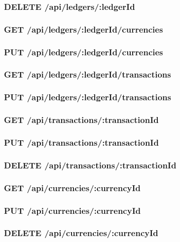 \documentclass[a4paper,parskip=half]{scrartcl}
\begin{document}
\subsubsection{DELETE /api/ledgers/:ledgerId}

\subsubsection{GET /api/ledgers/:ledgerId/currencies}

\subsubsection{PUT /api/ledgers/:ledgerId/currencies}

\subsubsection{GET /api/ledgers/:ledgerId/transactions}

\subsubsection{PUT /api/ledgers/:ledgerId/transactions}

\subsubsection{GET /api/transactions/:transactionId}

\subsubsection{PUT /api/transactions/:transactionId}

\subsubsection{DELETE /api/transactions/:transactionId}

\subsubsection{GET /api/currencies/:currencyId}

\subsubsection{PUT /api/currencies/:currencyId}

\subsubsection{DELETE /api/currencies/:currencyId}




\end{document}
